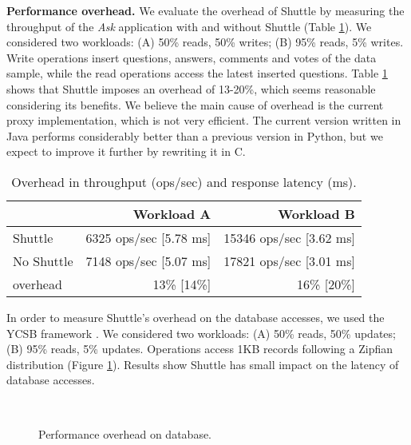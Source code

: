\textbf{Performance overhead.}
We evaluate the overhead of Shuttle by measuring the throughput of the \textit{Ask} application with and without Shuttle (Table \ref{tab:throughput}). We considered two workloads: (A) 50\% reads, 50\% writes;  (B)  95\% reads, 5\% writes. Write operations insert questions, answers, comments and votes of the data sample, while the read operations access the latest inserted questions. Table \ref{tab:throughput} shows that Shuttle imposes an overhead of 13-20\%, which seems reasonable considering its benefits. We believe the main cause of overhead is the current proxy implementation, which is not very efficient. The current version written in Java performs considerably better than a previous version in Python, but we expect to improve it further by rewriting it in C.

\begin{table}
\footnotesize
\begin{tabular}{l|rr}
                       &  Workload A                    & Workload B  \\ \hline
Shuttle                &  6325 ops/sec [5.78 ms]        &  15346 ops/sec [3.62 ms]  \\
No Shuttle             &  7148 ops/sec [5.07 ms]        &  17821 ops/sec [3.01 ms]  \\
overhead               &  13\% [14\%]                    & 16\% [20\%] \\
\end{tabular}
\caption{Overhead in throughput (ops/sec) and response latency (ms).}
\label{tab:throughput}
\vspace{-3mm}
\end{table}

In order to measure Shuttle's overhead on the database accesses, we used the \acf{YCSB} framework \cite{ycsb}. We considered two workloads: (A)  50\% reads, 50\% updates; (B)  95\% reads, 5\% updates. Operations access 1KB records following a Zipfian distribution (Figure \ref{fig:database_overhead}). Results show Shuttle has small impact on the latency of database accesses. 

\begin{figure}[tbh]
\vspace{-6mm}
\hspace*{-0.5cm}
  \LARGE
  \mbox{
  }
  \caption{Performance overhead on database.}
  \vspace{-2mm}
  \label{fig:database_overhead}
\end{figure}


